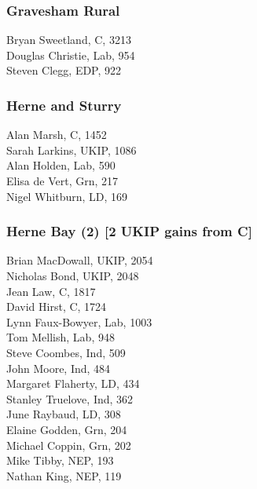 \documentclass[a4paper,openany,10pt]{book}
\begin{document}
\subsubsection*{Gravesham Rural}



Bryan Sweetland, C, 3213\\
Douglas Christie, Lab, 954\\
Steven Clegg, EDP, 922\\


\subsubsection*{Herne and Sturry}



Alan Marsh, C, 1452\\
Sarah Larkins, UKIP, 1086\\
Alan Holden, Lab, 590\\
Elisa de Vert, Grn, 217\\
Nigel Whitburn, LD, 169\\


\subsubsection*{Herne Bay (2) \hspace*{\fill}\nolinebreak[1]%
\enspace\hspace*{\fill}
[2 UKIP gains from C]}



Brian MacDowall, UKIP, 2054\\
Nicholas Bond, UKIP, 2048\\
Jean Law, C, 1817\\
David Hirst, C, 1724\\
Lynn Faux-Bowyer, Lab, 1003\\
Tom Mellish, Lab, 948\\
Steve Coombes, Ind, 509\\
John Moore, Ind, 484\\
Margaret Flaherty, LD, 434\\
Stanley Truelove, Ind, 362\\
June Raybaud, LD, 308\\
Elaine Godden, Grn, 204\\
Michael Coppin, Grn, 202\\
Mike Tibby, NEP, 193\\
Nathan King, NEP, 119\\
\end{document}
